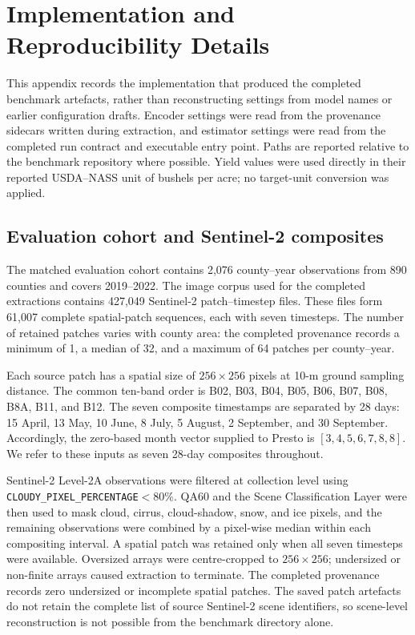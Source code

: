 \section{Implementation and Reproducibility Details}
\label{app:implementation}

\providecommand{\artifacthash}[4]{\texttt{#1}\allowbreak\texttt{#2}\allowbreak\texttt{#3}\allowbreak\texttt{#4}}
\providecommand{\artifactrevision}[4]{\texttt{#1}\allowbreak\texttt{#2}\allowbreak\texttt{#3}\allowbreak\texttt{#4}}

This appendix records the implementation that produced the completed benchmark
artefacts, rather than reconstructing settings from model names or earlier
configuration drafts.  Encoder settings were read from the provenance sidecars
written during extraction, and estimator settings were read from the completed
run contract and executable entry point.  Paths are reported relative to the
benchmark repository where possible.  Yield values were used directly in their
reported USDA--NASS unit of bushels per acre; no target-unit conversion was
applied.

\subsection{Evaluation cohort and Sentinel-2 composites}

The matched evaluation cohort contains 2,076 county--year observations from 890
counties and covers 2019--2022.  The image corpus used for the completed
extractions contains 427,049 Sentinel-2 patch--timestep files.  These files form
61,007 complete spatial-patch sequences, each with seven timesteps.  The number
of retained patches varies with county area: the completed provenance records a
minimum of 1, a median of 32, and a maximum of 64 patches per county--year.

Each source patch has a spatial size of $256\times256$ pixels at 10-m ground
sampling distance.  The common ten-band order is B02, B03, B04, B05, B06, B07,
B08, B8A, B11, and B12.  The seven composite timestamps are separated by 28
days: 15 April, 13 May, 10 June, 8 July, 5 August, 2 September, and 30
September.  Accordingly, the zero-based month vector supplied to Presto is
$[3,4,5,6,7,8,8]$.  We refer to these inputs as seven 28-day composites
throughout.

Sentinel-2 Level-2A observations were filtered at collection level using
\texttt{CLOUDY\_PIXEL\_PERCENTAGE}$<80\%$.  QA60 and the Scene Classification
Layer were then used to mask cloud, cirrus, cloud-shadow, snow, and ice pixels,
and the remaining observations were combined by a pixel-wise median within
each compositing interval.  A spatial patch was retained only when all seven
timesteps were available.  Oversized arrays were centre-cropped to
$256\times256$; undersized or non-finite arrays caused extraction to terminate.
The completed provenance records zero undersized or incomplete spatial patches.
The saved patch artefacts do not retain the complete list of source Sentinel-2
scene identifiers, so scene-level reconstruction is not possible from the
benchmark directory alone.


